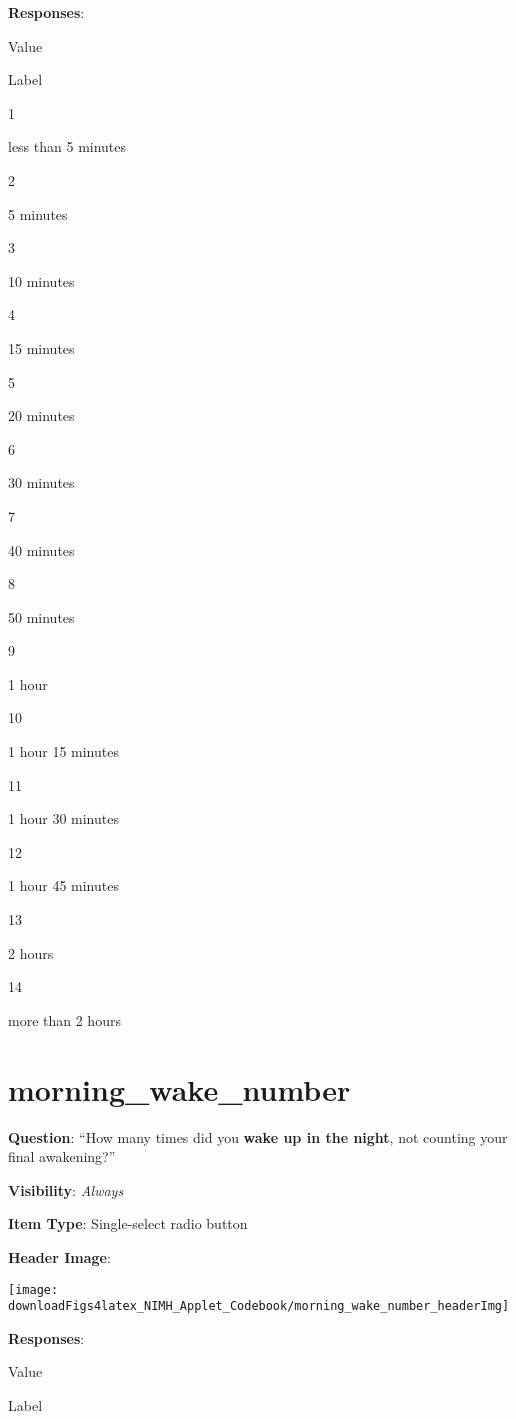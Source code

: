 \documentclass[]{book}
\begin{document}
\textbf{Responses}:

Value

Label

1

less than 5 minutes

2

5 minutes

3

10 minutes

4

15 minutes

5

20 minutes

6

30 minutes

7

40 minutes

8

50 minutes

9

1 hour

10

1 hour 15 minutes

11

1 hour 30 minutes

12

1 hour 45 minutes

13

2 hours

14

more than 2 hours

\hypertarget{morning_wake_number}{%
\section{morning\_wake\_number}\label{morning_wake_number}}

\textbf{Question}: ``How many times did you \textbf{wake up in the night}, not counting your final awakening?''

\textbf{Visibility}: \emph{Always}

\textbf{Item Type}: Single-select radio button

\textbf{Header Image}:

\begin{flushleft}\texttt{[image: downloadFigs4latex\_NIMH\_Applet\_Codebook/morning\_wake\_number\_headerImg]} \end{flushleft}

\textbf{Responses}:

Value

Label
\end{document}
